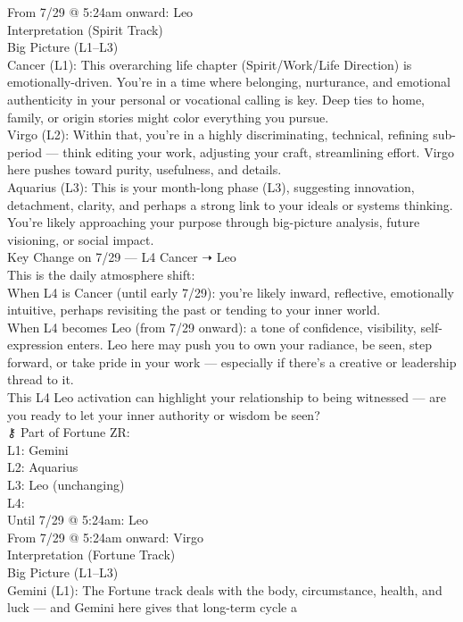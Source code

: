 \documentclass{article}
\begin{document}
From 7/29 @ 5:24am onward: Leo\\
 Interpretation (Spirit Track)\\
Big Picture (L1--L3)\\
Cancer (L1): This overarching life chapter (Spirit/Work/Life Direction)
is emotionally-driven. You're in a time where belonging, nurturance, and
emotional authenticity in your personal or vocational calling is key.
Deep ties to home, family, or origin stories might color everything you
pursue.\\
Virgo (L2): Within that, you're in a highly discriminating, technical,
refining sub-period --- think editing your work, adjusting your craft,
streamlining effort. Virgo here pushes toward purity, usefulness, and
details.\\
Aquarius (L3): This is your month-long phase (L3), suggesting
innovation, detachment, clarity, and perhaps a strong link to your
ideals or systems thinking. You're likely approaching your purpose
through big-picture analysis, future visioning, or social impact.\\
Key Change on 7/29 --- L4 Cancer ➝ Leo\\
This is the daily atmosphere shift:\\
When L4 is Cancer (until early 7/29): you're likely inward, reflective,
emotionally intuitive, perhaps revisiting the past or tending to your
inner world.\\
When L4 becomes Leo (from 7/29 onward): a tone of confidence,
visibility, self-expression enters. Leo here may push you to own your
radiance, be seen, step forward, or take pride in your work ---
especially if there's a creative or leadership thread to it.\\
This L4 Leo activation can highlight your relationship to being
witnessed --- are you ready to let your inner authority or wisdom be
seen?\\
⚷ Part of Fortune ZR:\\
L1: Gemini\\
L2: Aquarius\\
L3: Leo (unchanging)\\
L4:\\
Until 7/29 @ 5:24am: Leo\\
From 7/29 @ 5:24am onward: Virgo\\
 Interpretation (Fortune Track)\\
Big Picture (L1--L3)\\
Gemini (L1): The Fortune track deals with the body, circumstance,
health, and luck --- and Gemini here gives that long-term cycle a
\end{document}
